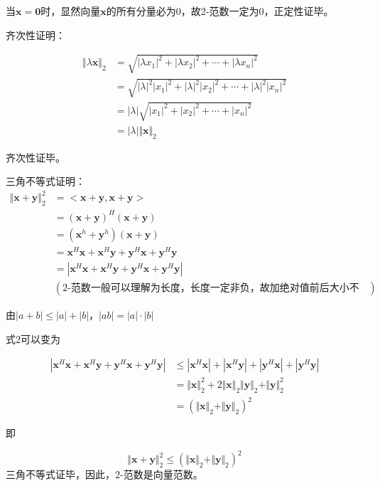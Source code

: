 \documentclass[12pt, a4paper, oneside, UTF8]{ctexbook}
\begin{document}
当$\boldsymbol{x=0}$时，显然向量$\boldsymbol{x}$的所有分量必为0，故2-范数一定为0，正定性证毕。

\noindent
齐次性证明：

\[
\begin{aligned}
    \Vert \lambda \boldsymbol{x}\Vert_2&=\sqrt{|\lambda x_1|^2+|\lambda x_2|^2+\cdots+|\lambda x_n|^2}\\
    &=\sqrt{|\lambda|^2|x_1|^2+|\lambda|^2|x_2|^2+\cdots+|\lambda|^2|x_n|^2}\\
    &=|\lambda|\sqrt{|x_1|^2+|x_2|^2+\cdots+|x_n|^2}\\
    &=|\lambda|\Vert \boldsymbol{x}\Vert_2
\end{aligned}
\]

齐次性证毕。

\noindent
三角不等式证明：
\[
\begin{aligned}
    \Vert \boldsymbol{x+y}\Vert_2^2&=<\boldsymbol{x+y,x+y}>\\
    &=(\boldsymbol{x+y})^H(\boldsymbol{x+y})\\
    &=(\boldsymbol{x}^h+\boldsymbol{y}^h)(\boldsymbol{x+y})\\
    &=\boldsymbol{x}^H\boldsymbol{x}+\boldsymbol{x}^H\boldsymbol{y}+\boldsymbol{y}^H\boldsymbol{x}+\boldsymbol{y}^H\boldsymbol{y}\\
    &=|\boldsymbol{x}^H\boldsymbol{x}+\boldsymbol{x}^H\boldsymbol{y}+\boldsymbol{y}^H\boldsymbol{x}+\boldsymbol{y}^H\boldsymbol{y}|\\&(\text{2-范数一般可以理解为长度，长度一定非负，故加绝对值前后大小不变})
\end{aligned}\tag{2}
\]

由$|a+b|\leq |a|+|b|，|ab|=|a|\cdot|b|$

式2可以变为

\[
\begin{aligned}
    |\boldsymbol{x}^H\boldsymbol{x}+\boldsymbol{x}^H\boldsymbol{y}+\boldsymbol{y}^H\boldsymbol{x}+\boldsymbol{y}^H\boldsymbol{y}|&\leq|\boldsymbol{x}^H\boldsymbol{x}|+|\boldsymbol{x}^H\boldsymbol{y}|+|\boldsymbol{y}^H\boldsymbol{x}|+|\boldsymbol{y}^H\boldsymbol{y}|\\
    &=\Vert\boldsymbol{x}\Vert_2^2+2\Vert\boldsymbol{x}\Vert_2\Vert\boldsymbol{y}\Vert_2+\Vert\boldsymbol{y}\Vert_2^2\\
    &=(\Vert\boldsymbol{x}\Vert_2+\Vert\boldsymbol{y}\Vert_2)^2
\end{aligned}
\]

即

\[
\Vert \boldsymbol{x+y}\Vert_2^2\leq(\Vert\boldsymbol{x}\Vert_2+\Vert\boldsymbol{y}\Vert_2)^2
\]
三角不等式证毕，因此，2-范数是向量范数。
\end{document}
